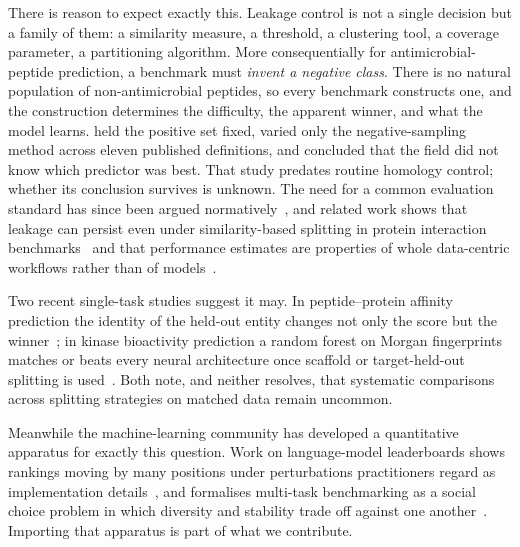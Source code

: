 \documentclass[11pt,a4paper]{article}
\begin{document}
There is reason to expect exactly this. Leakage control is not a single decision but a
family of them: a similarity measure, a threshold, a clustering tool, a coverage parameter,
a partitioning algorithm. More consequentially for antimicrobial-peptide prediction, a
benchmark must \emph{invent a negative class}. There is no natural population of
non-antimicrobial peptides, so every benchmark constructs one, and the construction
determines the difficulty, the apparent winner, and what the model learns.
\citet{sidorczuk2022negative} held the positive set fixed, varied only the negative-sampling
method across eleven published definitions, and concluded that the field did not know which
predictor was best. That study predates routine homology control; whether its conclusion
survives is unknown. The need for a common evaluation standard has since been argued
normatively~\citep{cisternagarcia2026framework}, and related work shows that leakage can
persist even under similarity-based splitting in protein interaction
benchmarks~\citep{bushuiev2024leakage} and that performance estimates are properties of
whole data-centric workflows rather than of models~\citep{sotogarcia2026datacentric}.

Two recent single-task studies suggest it may. In peptide--protein affinity prediction the
identity of the held-out entity changes not only the score but the
winner~\citep{tian2026affinity}; in kinase bioactivity prediction a random forest on Morgan
fingerprints matches or beats every neural architecture once scaffold or target-held-out
splitting is used~\citep{abbott2026kinase}. Both note, and neither resolves, that
systematic comparisons across splitting strategies on matched data remain uncommon.

Meanwhile the machine-learning community has developed a quantitative apparatus for exactly
this question. Work on language-model leaderboards shows rankings moving by many positions
under perturbations practitioners regard as implementation
details~\citep{alzahrani2024targets}, and formalises multi-task benchmarking as a social
choice problem in which diversity and stability trade off against one
another~\citep{zhang2024benchbench}. Importing that apparatus is part of what we contribute.
\end{document}
